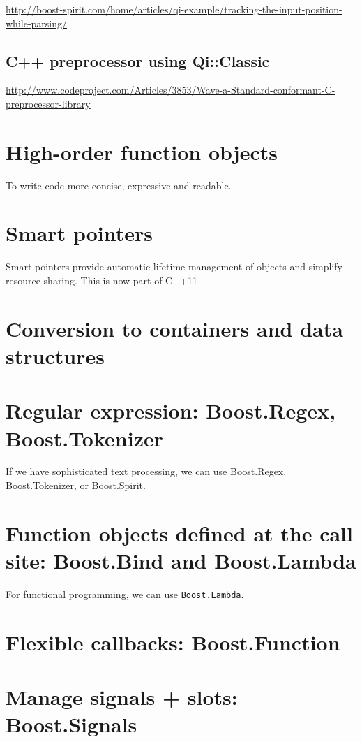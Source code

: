 \url{http://boost-spirit.com/home/articles/qi-example/tracking-the-input-position-while-parsing/}



\subsection{C++ preprocessor using Qi::Classic}

\url{http://www.codeproject.com/Articles/3853/Wave-a-Standard-conformant-C-preprocessor-library}

\section{High-order function objects}

To write code more concise, expressive and readable. 

\section{Smart pointers}

Smart pointers provide automatic lifetime management of objects and simplify
resource sharing. This is now part of C++11 

\section{Conversion to containers and data structures}


\section{Regular expression: Boost.Regex, Boost.Tokenizer}

If we have sophisticated text processing, we can use Boost.Regex, 
Boost.Tokenizer, or Boost.Spirit. 

\section{Function objects defined at the call site: Boost.Bind and
Boost.Lambda}

For functional programming, we can use \verb!Boost.Lambda!.

\section{Flexible callbacks: Boost.Function}

\section{Manage signals + slots: Boost.Signals}

